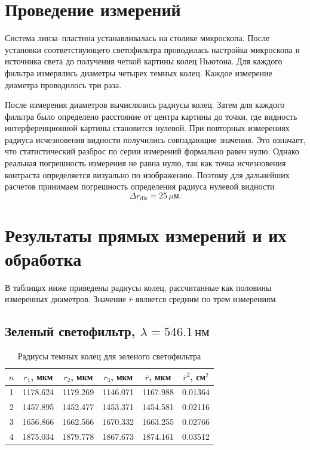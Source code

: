 \documentclass[12pt,a4paper]{article}
\newcommand{\um}{\ensuremath{\,\mu\text{м}}}
\newcommand{\nm}{\ensuremath{\,\text{нм}}}
\begin{document}
\section{Проведение измерений}

Система линза--пластина устанавливалась на столике микроскопа. После установки соответствующего светофильтра проводилась настройка микроскопа и источника света до получения четкой картины колец Ньютона. Для каждого фильтра измерялись диаметры четырех темных колец. Каждое измерение диаметра проводилось три раза.

После измерения диаметров вычислялись радиусы колец. Затем для каждого фильтра было определено расстояние от центра картины до точки, где видность интерференционной картины становится нулевой. При повторных измерениях радиуса исчезновения видности получились совпадающие значения. Это означает, что статистический разброс по серии измерений формально равен нулю. Однако реальная погрешность измерения не равна нулю, так как точка исчезновения контраста определяется визуально по изображению. Поэтому для дальнейших расчетов принимаем погрешность определения радиуса нулевой видности
\begin{equation}
    \Delta r_{\text{dis}} = 25\um.
\end{equation}

\section{Результаты прямых измерений и их обработка}

В таблицах ниже приведены радиусы колец, рассчитанные как половины измеренных диаметров. Значение $\overline r$ является средним по трем измерениям.

\subsection{Зеленый светофильтр, $\lambda = 546.1\nm$}

\begin{table}[H]
\centering
\small
\caption{Радиусы темных колец для зеленого светофильтра}
\begin{tabular}{cccccc}
\toprule
$n$ & $r_1$, мкм & $r_2$, мкм & $r_3$, мкм & $\overline r$, мкм & $\overline r^2$, см$^2$ \\
\midrule
1 & 1178.624 & 1179.269 & 1146.071 & 1167.988 & 0.01364 \\
2 & 1457.895 & 1452.477 & 1453.371 & 1454.581 & 0.02116 \\
3 & 1656.866 & 1662.566 & 1670.332 & 1663.255 & 0.02766 \\
4 & 1875.034 & 1879.778 & 1867.673 & 1874.161 & 0.03512 \\
\bottomrule
\end{tabular}
\end{table}
\end{document}
